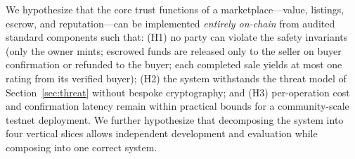 We hypothesize that the core trust functions of a marketplace---value, listings, escrow, and reputation---can be implemented \emph{entirely on-chain} from audited standard components such that: (H1) no party can violate the safety invariants (only the owner mints; escrowed funds are released only to the seller on buyer confirmation or refunded to the buyer; each completed sale yields at most one rating from its verified buyer); (H2) the system withstands the threat model of Section~\ref{sec:threat} without bespoke cryptography; and (H3) per-operation cost and confirmation latency remain within practical bounds for a community-scale testnet deployment. We further hypothesize that decomposing the system into four vertical slices allows independent development and evaluation while composing into one correct system.
